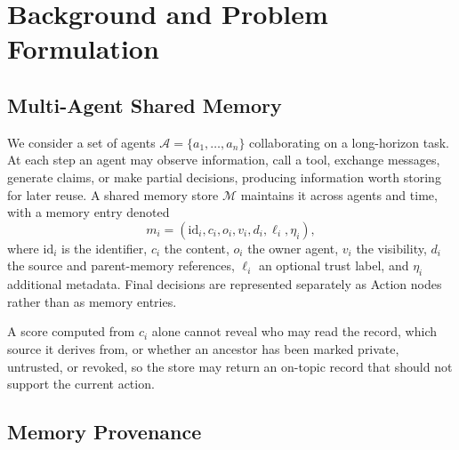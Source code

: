 \documentclass[letterpaper]{article} %
\begin{document}
\section{Background and Problem Formulation}
\label{sec:background-problem}

\subsection{Multi-Agent Shared Memory}
\label{sec:multi-agent-shared-memory}

We consider a set of agents $\mathcal{A}=\{a_1,\ldots,a_n\}$ collaborating on a long-horizon task. At each step an agent may observe information, call a tool, exchange messages, generate claims, or make partial decisions, producing information worth storing for later reuse. A shared memory store $\mathcal{M}$ maintains it across agents and time, with a memory entry denoted
\begin{equation}
m_i = (\mathrm{id}_i,c_i,o_i,v_i,d_i,\ell_i,\eta_i),
\label{eq:memory-entry}
\end{equation}
where $\mathrm{id}_i$ is the identifier, $c_i$ the content, $o_i$ the owner agent, $v_i$ the visibility, $d_i$ the source and parent-memory references, $\ell_i$ an optional trust label, and $\eta_i$ additional metadata. Final decisions are represented separately as Action nodes rather than as memory entries.

A score computed from $c_i$ alone cannot reveal who may read the record, which source it derives from, or whether an ancestor has been marked private, untrusted, or revoked, so the store may return an on-topic record that should not support the current action.


\subsection{Memory Provenance}
\label{sec:memory-provenance}

\end{document}
